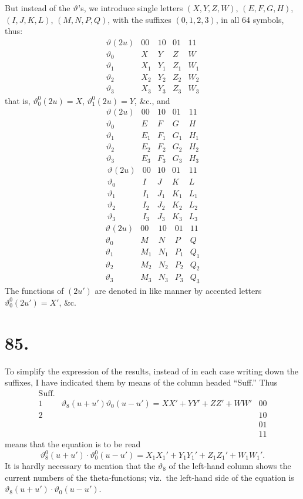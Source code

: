 \documentclass[11pt,a4paper]{article}
\newcommand{\uth}[1]{\vartheta_{#1}}
\begin{document}
But instead of the $\uth{}$'s, we introduce single letters $(X, Y, Z, W)$, $(E, F, G, H)$, $(I, J, K, L)$, $(M, N, P, Q)$, with the suffixes $(0, 1, 2, 3)$, in all 64 symbols, thus:
\[
\begin{array}{c|cccc}
\uth{}(2u) & 00 & 10 & 01 & 11 \\
\hline
\uth{0} & X & Y & Z & W \\
\uth{1} & X_1 & Y_1 & Z_1 & W_1 \\
\uth{2} & X_2 & Y_2 & Z_2 & W_2 \\
\uth{3} & X_3 & Y_3 & Z_3 & W_3
\end{array}
\]
that is, $\uth{0}^0(2u) = X$, $\uth{1}^0(2u) = Y$, \&c., and
\[
\begin{array}{c|cccc}
\uth{}(2u) & 00 & 10 & 01 & 11 \\
\hline
\uth{0} & E & F & G & H \\
\uth{1} & E_1 & F_1 & G_1 & H_1 \\
\uth{2} & E_2 & F_2 & G_2 & H_2 \\
\uth{3} & E_3 & F_3 & G_3 & H_3
\end{array}
\]
\[
\begin{array}{c|cccc}
\uth{}(2u) & 00 & 10 & 01 & 11 \\
\hline
\uth{0} & I & J & K & L \\
\uth{1} & I_1 & J_1 & K_1 & L_1 \\
\uth{2} & I_2 & J_2 & K_2 & L_2 \\
\uth{3} & I_3 & J_3 & K_3 & L_3
\end{array}
\]
\[
\begin{array}{c|cccc}
\uth{}(2u) & 00 & 10 & 01 & 11 \\
\hline
\uth{0} & M & N & P & Q \\
\uth{1} & M_1 & N_1 & P_1 & Q_1 \\
\uth{2} & M_2 & N_2 & P_2 & Q_2 \\
\uth{3} & M_3 & N_3 & P_3 & Q_3
\end{array}
\]
The functions of $(2u')$ are denoted in like manner by accented letters $\uth{0}^0(2u') = X'$, \&c.

\newpage
\section*{85.}
\label{sec:85}

To simplify the expression of the results, instead of in each case writing down the suffixes, I have indicated them by means of the column headed ``Suff.'' Thus
\[
\begin{array}{c|c|c}
\text{Suff.} & & \\
\hline
1 & \uth{8}(u+u')\uth{0}(u-u') = XX' + YY' + ZZ' + WW' & 00 \\
2 & & 10 \\
& & 01 \\
& & 11
\end{array}
\]
means that the equation is to be read
\[
\uth{8}^0(u+u') \cdot \uth{0}^0(u-u') = X_1X_1' + Y_1Y_1' + Z_1Z_1' + W_1W_1'.
\]
It is hardly necessary to mention that the $\uth{8}$ of the left-hand column shows the current numbers of the theta-functions; viz.\ the left-hand side of the equation is $\uth{8}(u+u') \cdot \uth{0}(u-u')$.
\end{document}
